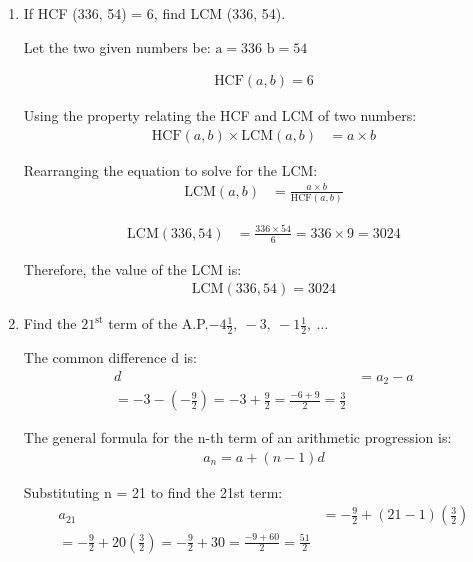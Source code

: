 \begin{enumerate}[label=\thesubsection.\arabic*, ref=\thesubsection.\theenumi]
  Therefore, the given quadratic equation has no real roots.
   NEED TO ADD GRAPH AND PYTHON CODE
  
	\item If HCF (336, 54) = 6, find LCM (336, 54).
	
	\solution
	Let the two given numbers be: $\text{a}=336$  $\text{b}=54$
	
	\begin{align*}
		\text{HCF}(a, b) = 6
	\end{align*}
	
	Using the property relating the HCF and LCM of two numbers:
	\begin{align*}
		\text{HCF}(a, b) \times \text{LCM}(a, b) &= a \times b
	\end{align*}
	
	Rearranging the equation to solve for the LCM:
	\begin{align*}
		\text{LCM}(a, b) &= \frac{a \times b}{\text{HCF}(a, b)}
	\end{align*}
	
	\begin{align*}
		\text{LCM}(336, 54) &= \frac{336 \times 54}{6} = 336 \times 9 = 3024
	\end{align*}
	
	Therefore, the value of the LCM is:
	\begin{align*}
		\text{LCM}(336, 54) = 3024
	\end{align*}
	
	
	\item Find the $21^{\text{st}}$ term of the A.P.$-4\frac{1}{2},\ -3,\ -1\frac{1}{2},\ \ldots$
	
	\solution
	The common difference d is:
	\begin{align*}
		d &= a_2 - a \\
		= -3 - \left(-\frac{9}{2}\right) 
		= -3 + \frac{9}{2} 
		= \frac{-6 + 9}{2} 
		= \frac{3}{2}
	\end{align*}
	
	The general formula for the n-th term of an arithmetic progression is:
	\begin{align*}
		a_n = a + (n - 1)d
	\end{align*}
	
	Substituting n = 21 to find the 21st term:
	\begin{align*}
		a_{21} &= -\frac{9}{2} + (21 - 1)\left(\frac{3}{2}\right) \\
		= -\frac{9}{2} + 20\left(\frac{3}{2}\right) 
		= -\frac{9}{2} + 30 
		= \frac{-9 + 60}{2} 
		= \frac{51}{2}
	\end{align*}
	

\end{enumerate}
